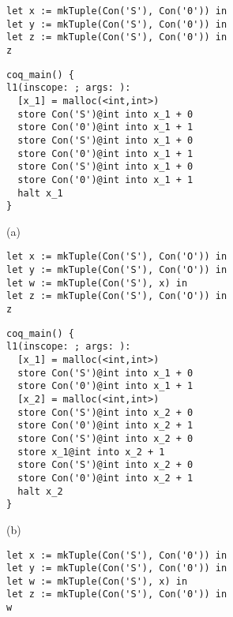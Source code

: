 \documentclass{article}
\begin{document}
\begin{figure}
\centering
\begin{minipage}[t]{.31\textwidth}
\begin{lstlisting}
let x := mkTuple(Con('S'), Con('0')) in
let y := mkTuple(Con('S'), Con('0')) in
let z := mkTuple(Con('S'), Con('0')) in
z
\end{lstlisting}
\begin{lstlisting}
coq_main() {
l1(inscope: ; args: ):
  [x_1] = malloc(<int,int>)
  store Con('S')@int into x_1 + 0
  store Con('0')@int into x_1 + 1
  store Con('S')@int into x_1 + 0
  store Con('0')@int into x_1 + 1
  store Con('S')@int into x_1 + 0
  store Con('0')@int into x_1 + 1
  halt x_1
}
\end{lstlisting}
\centering (a)
\end{minipage}
\hspace{5pt}
\begin{minipage}[t]{.31\textwidth}
\begin{lstlisting}
let x := mkTuple(Con('S'), Con('O')) in
let y := mkTuple(Con('S'), Con('O')) in
let w := mkTuple(Con('S'), x) in
let z := mkTuple(Con('S'), Con('O')) in
z
\end{lstlisting}
\begin{lstlisting}
coq_main() {
l1(inscope: ; args: ):
  [x_1] = malloc(<int,int>)
  store Con('S')@int into x_1 + 0
  store Con('0')@int into x_1 + 1
  [x_2] = malloc(<int,int>)
  store Con('S')@int into x_2 + 0
  store Con('0')@int into x_2 + 1
  store Con('S')@int into x_2 + 0
  store x_1@int into x_2 + 1
  store Con('S')@int into x_2 + 0
  store Con('0')@int into x_2 + 1
  halt x_2
}
\end{lstlisting}
\centering (b)
\end{minipage}
\hspace{5pt}
\begin{minipage}[t]{.31\textwidth}
\begin{lstlisting}
let x := mkTuple(Con('S'), Con('0')) in
let y := mkTuple(Con('S'), Con('0')) in
let w := mkTuple(Con('S'), x) in
let z := mkTuple(Con('S'), Con('0')) in
w
\end{lstlisting}
\begin{lstlisting}

\end{lstlisting}
\end{minipage}
\end{figure}
\end{document}
